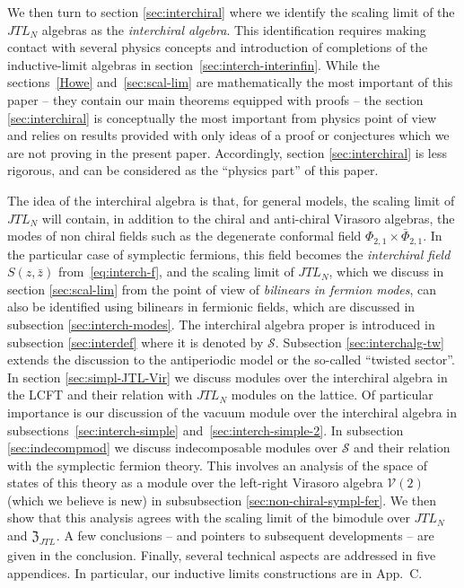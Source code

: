 \documentclass[11pt]{article}
\newcommand{\JTL}[1]{JTL_{#1}}
\newcommand{\VirN}{\boldsymbol{\mathcal{V}}}
\newcommand{\interchalg}{\mathcal{S}}
\newcommand{\cent}{\mathfrak{Z}}
\newcommand{\centJTL}{\cent_{\JTL{}}}
\newcommand{\enrg}{S}
\newcommand{\AppLim}{C}
\theoremstyle{definition}
\begin{document}
We then turn to section  \ref{sec:interchiral} where we identify the scaling limit of the $\JTL{N}$ algebras as  the {\sl interchiral algebra}. This identification requires making contact with several physics concepts and introduction of completions of the inductive-limit algebras in section~\ref{sec:interch-interinfin}.
While the sections~\ref{Howe} and~\ref{sec:scal-lim} are mathematically the most important of this paper -- they contain our main theorems equipped with proofs --
the section  \ref{sec:interchiral} is conceptually the most important from physics point of view and relies on results provided with only ideas of a proof or conjectures which we are not proving in the present paper.
Accordingly, section  \ref{sec:interchiral} is less rigorous, and  can  be considered   as the ``physics part'' of this paper.

The idea of the interchiral algebra is that, for general models,  the scaling limit of $\JTL{N}$ will contain, in addition to the chiral and anti-chiral Virasoro algebras, the modes of non chiral fields such as the degenerate conformal field $\Phi_{2,1}\times\bar{\Phi}_{2,1}$. In the particular case of symplectic fermions, this field becomes  the \textit{interchiral field} $\enrg(z,\bar{z})$ from~\eqref{eq:interch-f}, and the scaling limit of $\JTL{N}$, which we discuss in section  \ref{sec:scal-lim}  from the point of view of  \textit{ bilinears in fermion modes}, can also be  identified using  bilinears in fermionic fields, which are discussed in subsection \ref{sec:interch-modes}. The interchiral algebra proper is introduced in subsection \ref{sec:interdef} where it is denoted by $\interchalg$. Subsection \ref{sec:interchalg-tw} extends the discussion to the antiperiodic model or the so-called ``twisted sector''.  In section \ref{sec:simpl-JTL-Vir} we discuss modules over the interchiral algebra in the LCFT and their relation with  $\JTL{N}$ modules on the lattice. Of particular importance is our discussion of the vacuum module over the interchiral algebra in subsections~\ref{sec:interch-simple} and~\ref{sec:interch-simple-2}. In subsection \ref{sec:indecompmod} we discuss indecomposable modules over $\interchalg$ and their relation with the  symplectic  fermion theory. This involves an analysis of the  space  of states of this theory as a module over the left-right Virasoro algebra $\VirN(2)$ (which we believe is new) in subsubsection \ref{sec:non-chiral-sympl-fer}.  We then show that this analysis agrees with the scaling limit of the bimodule over $\JTL{N}$ and $\centJTL$. A few conclusions -- and pointers to subsequent developments -- are given in the conclusion. Finally, several technical aspects are addressed in five appendices. In particular, our inductive limits constructions are in App.~\AppLim.
\end{document}
